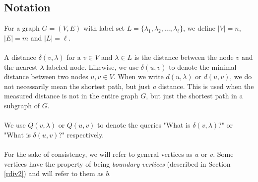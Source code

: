\subsection{Notation}\label{notation}
For a graph $G=(V,E)$ with label set $L=\{\lambda_1, \lambda_2, \dots, \lambda_\ell\}$,
we define $|V|=n$, $|E|=m$ and $|L|=\ell$. \\
\\
A distance $\delta(v,\lambda)$ for a $v\in V$ and $\lambda\in L$ is the distance between
the node $v$ and the nearest $\lambda$-labeled node. Likewise, we use $\delta(u,v)$ to denote
the minimal distance between two nodes $u,v\in V$. When we write $d(u,\lambda)$ or
$d(u,v)$, we do not necessarily mean the shortest path, but just \textit{a} distance.
This is used when the measured distance is not in the entire graph $G$, but just the shortest
path in a subgraph of $G$. \\
\\
We use $Q(v,\lambda)$ or $Q(u,v)$ to denote the queries "What is $\delta(v,\lambda)$?" or
"What is $\delta(u,v)$?" respectively. \\
\\
For the sake of consistency, we will refer to general vertices as $u$ or $v$. Some
vertices have the property of being \textit{boundary vertices} (described in Section
\ref{rdiv2}) and will refer to them as $b$.
